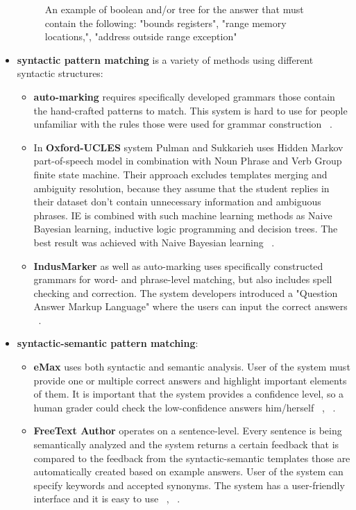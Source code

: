 \documentclass[11pt]{report}
\numberwithin{equation}{section} %
\begin{document}
\begin{itemize}
\begin{figure}[h!]
    \caption{ An example of boolean and/or tree for the answer that must contain the following: "bounds registers", "range memory locations,", "address outside range exception" ~\cite{Thomas} }\label{fig:AndOr}
\end{figure}
\item \textbf{syntactic pattern matching} is a variety of methods using different syntactic structures:
\begin{itemize}
\item \textbf{auto-marking} requires specifically developed grammars those contain the hand-crafted patterns to match. This system is hard to use for people unfamiliar with the rules those were used for grammar construction ~\cite{Hasanah}.
\item In \textbf{Oxford-UCLES} system Pulman and Sukkarieh uses Hidden Markov part-of-speech model in combination with Noun Phrase and Verb Group finite state machine. Their approach excludes templates merging and ambiguity resolution, because they assume that the student replies in their dataset don't contain unnecessary information and ambiguous phrases. IE is combined with such machine learning methods as Naive Bayesian learning, inductive logic programming and decision trees. The best result was achieved with Naive Bayesian learning ~\cite{Pulman}.
\item \textbf{IndusMarker} as well as auto-marking uses specifically constructed grammars for word- and phrase-level matching, but also includes spell checking and correction. The system developers introduced a "Question Answer Markup Language" where the users can input the correct answers ~\cite{Burrows}.
\end{itemize}
\item \textbf{syntactic-semantic pattern matching}:
\begin{itemize}
\item \textbf{eMax} uses both syntactic and semantic analysis. User of the system must provide one or multiple correct answers and highlight important elements of them. It is important that the system provides a confidence level, so a human grader could check the low-confidence answers him/herself ~\cite{Burrows}, ~\cite{Hasanah}.
\item \textbf{FreeText Author} operates on a sentence-level. Every sentence is being semantically analyzed and the system returns a certain feedback that is compared to the feedback from the syntactic-semantic templates those are automatically created based on example answers. User of the system can specify keywords and accepted synonyms. The system has a user-friendly interface and it is easy to use ~\cite{Burrows}, ~\cite{Hasanah}.

\end{itemize}
\end{itemize}
\end{document}
